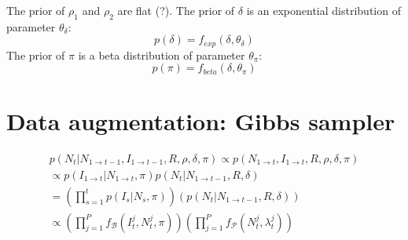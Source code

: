 \documentclass[a4paper,11pt]{article}
\begin{document}
The prior of $\rho_1$ and $\rho_2$ are flat (?).
The prior of $\delta$ is an exponential distribution of parameter 
$\theta_{\delta}$:
\begin{equation}
p(\delta) = f_{exp}(\delta,  \theta_{\delta})
\end{equation}
The prior of $\pi$ is a beta distribution of parameter 
$\theta_{\pi}$:
\begin{equation}
p(\pi) = f_{beta}(\delta,  \theta_{\pi})
\end{equation}





\section{Data augmentation: Gibbs sampler}


\begin{eqnarray}
p(N_t | N_{1 \rightarrow t-1}, I_{1 \rightarrow t-1}, R, \rho, \delta, \pi) 
\propto p(N_{1 \rightarrow t}, I_{1 \rightarrow t}, R, \rho, \delta, \pi) \\
\propto p( I_{1 \rightarrow t} | N_{1 \rightarrow t}, \pi) 
p(N_t | N_{1 \rightarrow t-1},  R, \delta) \\
= (\prod_{s=1}^t p(I_s| N_s, \pi)) 
(p(N_t | N_{1 \rightarrow t-1}, R, \delta)) \\
\propto (\prod_{j=1}^P f_{\mathcal{B}}(I_t^j, N_t^j, \pi))
(\prod_{j=1}^P  f_{\mathcal{P}}(N_t^j, \lambda_t^j))
\end{eqnarray}

%
%
\end{document}
